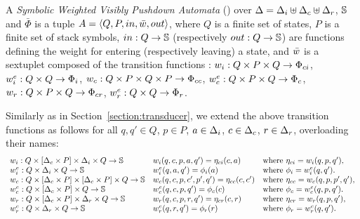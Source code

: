 \begin{definition}
A \emph{Symbolic Weighted Visibly Pushdown Automata} (\SWVPA)
over  $\Delta = \Deltai \uplus \Deltac \uplus \Deltar$, $\mathbb{S}$ and $\bar\Phi$
is a tuple $A = \< Q, P, \init, \bar\wei, \final >$,
where $Q$ is a finite set of states,
$P$ is a finite set of stack symbols,
$\mathsf{in} : Q \to \Semiring$
(respectively $\mathsf{out} : Q \to \Semiring$)
are functions defining the weight for entering
(respectively leaving) a state,
and $\bar\wei$ is a sextuplet composed of the transition functions :
$\weii : Q \times P \times Q \to \Phici$,
$\weiei : Q \times Q \to \Phii$,
$\weic : Q \times P \times Q \times P \to \Phicc$,
$\weiec : Q \times P \times Q \to \Phic$,
$\weir : Q \times P \times Q \to \Phicr$,
$\weier : Q \times Q \to \Phir$.
\end{definition}
%
Similarly as in Section~\ref{section:transducer},
we extend the above transition functions as follows
for all $q, q' \in Q$, $p \in P$,
$a \in \Deltai$,
$\call{c} \in \Deltac$,
$\return{r} \in \Deltar$,
overloading their names: %
\[
\begin{array}{lll}
\weii: Q \times [\Deltac \times P] \times \Deltai \times Q \to \Semiring &
\weii(q, c, p, a, q') = \eta_\mathsf{ci}(c, a) &
\mathrm{where~} \eta_\mathsf{ci} = \weii(q, p, q'),\\
%
\weiei: Q \times \Deltai \times Q \to \Semiring &
\weiei(q, a, q') = \phi_\mathsf{i}(a) &
\mathrm{where~} \phi_\mathsf{i} = \weiei(q, q').\\
%
\weic: Q \times [\Deltac \times P] \times  [\Deltac \times P] \times Q \to \Semiring &
\weic(q, c, p, \call{c'}, p', q') = \eta_\mathsf{cc}(c, \call{c'}) &
\mathrm{where~} \eta_\mathsf{cc} = \weic(q, p, p', q'),\\
%
\weiec: Q \times [\Deltac \times P] \times Q \to \Semiring &
\weiec(q, {\call{c}}, p, q') = \phi_\mathsf{c}({\call{c}}) &
\mathrm{where~} \phi_\mathsf{c} = \weiec(q, p, q').\\
%
\weir: Q \times [\Deltac \times P] \times \Deltar \times Q \to \Semiring &
\weir(q, {\call{c}},  p, {\return{r}}, q') = \eta_\mathsf{cr}({\call{c}},  {\return{r}}) &
\mathrm{where~} \eta_\mathsf{cr} = \weir(q, p, q'),\\
%
\weier: Q \times \Deltar \times Q \to \Semiring &
\weier(q, {\return{r}}, q') = \phi_\mathsf{r}({\return{r}}) &
\mathrm{where~} \phi_\mathsf{r} = \weier(q, q').\\
\end{array}
\]

